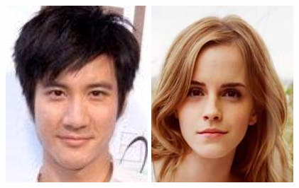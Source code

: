 \documentclass[10pt,twocolumn,letterpaper]{article}
\begin{document}
\begin{figure}[htbp]
{\begin{minipage}[b]{0.22\linewidth}
\includegraphics[width=0.99\linewidth]{img/real_world_photos/r2.png}
\includegraphics[width=0.99\linewidth]{img/real_world_photos/r3.png}

\end{minipage}}
\end{figure}
\end{document}
